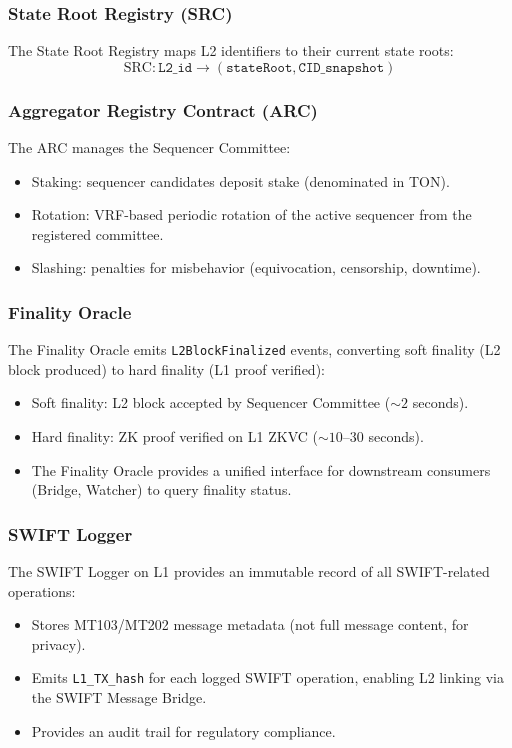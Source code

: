 \documentclass[12pt,a4paper]{article}
\theoremstyle{definition}
\theoremstyle{remark}
\begin{document}
\subsubsection{State Root Registry (SRC)}

The State Root Registry maps L2 identifiers to their current state roots:
\begin{equation}
\text{SRC}: \texttt{L2\_id} \to (\texttt{stateRoot}, \texttt{CID\_snapshot})
\end{equation}

\subsubsection{Aggregator Registry Contract (ARC)}

The ARC manages the Sequencer Committee:
\begin{itemize}[nosep]
    \item Staking: sequencer candidates deposit stake (denominated in TON).
    \item Rotation: VRF-based periodic rotation of the active sequencer from the registered committee.
    \item Slashing: penalties for misbehavior (equivocation, censorship, downtime).
\end{itemize}

\subsubsection{Finality Oracle}

The Finality Oracle emits \texttt{L2BlockFinalized} events, converting soft finality (L2 block produced) to hard finality (L1 proof verified):
\begin{itemize}[nosep]
    \item Soft finality: L2 block accepted by Sequencer Committee (${\sim}2$ seconds).
    \item Hard finality: ZK proof verified on L1 ZKVC (${\sim}10$--$30$ seconds).
    \item The Finality Oracle provides a unified interface for downstream consumers (Bridge, Watcher) to query finality status.
\end{itemize}

\subsubsection{SWIFT Logger}
\label{sec:swift-logger}

The SWIFT Logger on L1 provides an immutable record of all SWIFT-related operations:
\begin{itemize}[nosep]
    \item Stores MT103/MT202 message metadata (not full message content, for privacy).
    \item Emits \texttt{L1\_TX\_hash} for each logged SWIFT operation, enabling L2 linking via the SWIFT Message Bridge.
    \item Provides an audit trail for regulatory compliance.
\end{itemize}
\end{document}
